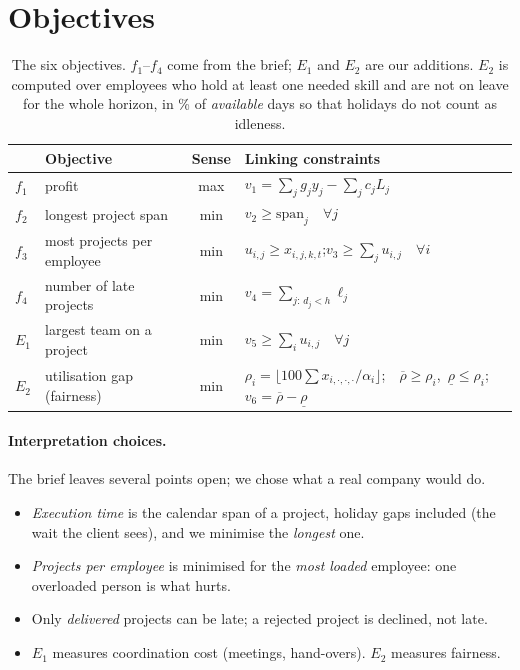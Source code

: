 \documentclass[10pt,a4paper]{article}
\theoremstyle{plain}
\theoremstyle{definition}
\theoremstyle{remark}
\newcommand{\avail}[1]{\alpha_{#1}}
\begin{document}
\section{Objectives}\label{sec:objectives}

\begin{table}[!htbp]
\centering\small
\renewcommand{\arraystretch}{1.25}
\begin{tabularx}{\linewidth}{@{}l l c X@{}}
\toprule
& \textbf{Objective} & \textbf{Sense} & \textbf{Linking constraints} \\
\midrule
$f_1$ & profit & max & $v_1 = \sum_j g_j y_j - \sum_j c_j L_j$ \\
$f_2$ & longest project span & min & $v_2 \ge \mathrm{span}_j\quad\forall j$ \\
$f_3$ & most projects per employee & min & $u_{i,j}\ge x_{i,j,k,t}$;\quad $v_3\ge\sum_j u_{i,j}\quad\forall i$ \\
$f_4$ & number of late projects & min & $v_4 = \sum_{j:\,d_j<h} \ell_j$ \\
$E_1$ & largest team on a project & min & $v_5\ge\sum_i u_{i,j}\quad\forall j$ \\
$E_2$ & utilisation gap (fairness) & min &
  $\rho_i=\big\lfloor 100\sum x_{i,\cdot,\cdot,\cdot}/\avail{i}\big\rfloor$;\ \ $\overline\rho\ge\rho_i$,\ $\underline\rho\le\rho_i$;\ \ $v_6=\overline\rho-\underline\rho$ \\
\bottomrule
\end{tabularx}
\caption{The six objectives. $f_1$--$f_4$ come from the brief; $E_1$ and $E_2$ are our additions.
$E_2$ is computed over employees who hold at least one needed skill and are not on leave for the
whole horizon, in \% of \emph{available} days so that holidays do not count as idleness.}
\label{tab:objectives}
\end{table}

\paragraph{Interpretation choices.} The brief leaves several points open; we chose what a real
company would do.
\begin{itemize}
  \item \emph{Execution time} is the calendar span of a project, holiday gaps included (the wait the
        client sees), and we minimise the \emph{longest} one.
  \item \emph{Projects per employee} is minimised for the \emph{most loaded} employee: one overloaded
        person is what hurts.
  \item Only \emph{delivered} projects can be late; a rejected project is declined, not late.
  \item $E_1$ measures coordination cost (meetings, hand-overs). $E_2$ measures fairness.
\end{itemize}
\end{document}
